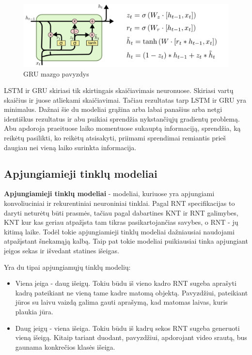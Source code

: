 \documentclass{VUMIFPSbakalaurinis}
\begin{document}
\begin{figure}[H]
	\centering
	\includegraphics[scale=0.5, trim={0 0 12.9cm 0}, clip]{img/gru}
	\caption[]{GRU mazgo pavyzdys\footnotemark}
	\label{img:gru}
\end{figure}


LSTM ir GRU skiriasi tik skirtingais skaičiavimais neuronuose. Skiriasi vartų skaičius ir juose atliekami skaičiavimai. Tačiau rezultatas tarp LSTM ir GRU yra minimalus. Dažnai šie du modeliai grąžina arba labai panašius arba netgi identiškus rezultatus ir abu puikiai sprendžia nykstančiųjų gradientų problemą. Abu apdoroja praeituose laiko momentuose sukauptą informaciją, sprendžia, ką reikėtų pasilikti, ko reikėtų atsisakyti, priimami sprendimai remiantis prieš daugiau nei vieną laiko surinkta informacija.

\subsection{Apjungiamieji tinklų modeliai}

\textbf{Apjungiamieji tinklų modeliai} - modeliai, kuriuose yra apjungiami konvoliuciniai ir rekurentiniai neuroniniai tinklai. Pagal RNT specifikacijas to daryti neturėtų būti prasmės, tačiau pagal dabartines KNT ir RNT galimybes, KNT kur kas geriau atpažįsta tam tikras pasikartojančias savybes, o RNT - jų kitimą laike. Todėl tokie apjungiamieji tinklų modeliai dažniausiai naudojami atpažįstant šnekamąją kalbą. Taip pat tokie modeliai puikiausiai tinka apjungiant įeigos sekas ir išvedant statines išeigas. 

Yra du tipai apjungiamųjų tinklų modelių:
\begin{itemize}
	\item Viena įeiga - daug išeigų. Tokiu būdu iš vieno kadro RNT sugeba aprašyti kadrą pateikiant ne vieną tame kadre matomą objektą. Pavyzdžiui, pateikiant jūros su laivu vaizdą galima gauti aprašymą, kad matomas laivas, kuris plaukia jūra.
	\item Daug įeigų - viena išeiga. Tokiu būdu iš kadrų sekos RNT sugeba generuoti vieną išeigą. Kitaip tariant duodant, pavyzdžiui, apdorojant video srautą, bus gaunama konkrečios klasės išeiga.
\end{itemize}
\end{document}
